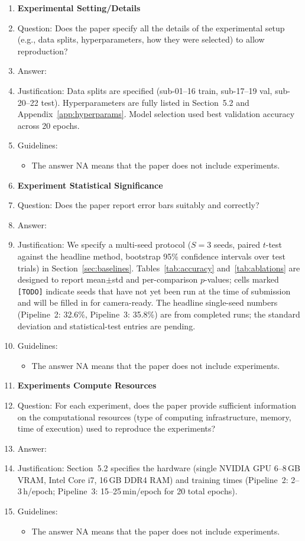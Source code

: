 \documentclass{article}
\begin{document}
\begin{enumerate}
\item {\bf Experimental Setting/Details}
    \item[] Question: Does the paper specify all the details of the experimental setup (e.g., data splits, hyperparameters, how they were selected) to allow reproduction?
    \item[] Answer: \answerYes{}
    \item[] Justification: Data splits are specified (sub-01--16 train, sub-17--19 val, sub-20--22 test). Hyperparameters are fully listed in Section~5.2 and Appendix~\ref{app:hyperparams}. Model selection used best validation accuracy across 20 epochs.
    \item[] Guidelines:
    \begin{itemize}
        \item The answer NA means that the paper does not include experiments.
    \end{itemize}

\item {\bf Experiment Statistical Significance}
    \item[] Question: Does the paper report error bars suitably and correctly?
    \item[] Answer: \answerYes{}
    \item[] Justification: We specify a multi-seed protocol ($S=3$ seeds, paired $t$-test against the headline method, bootstrap 95\% confidence intervals over test trials) in Section~\ref{sec:baselines}. Tables~\ref{tab:accuracy} and~\ref{tab:ablations} are designed to report mean$\pm$std and per-comparison $p$-values; cells marked \texttt{[TODO]} indicate seeds that have not yet been run at the time of submission and will be filled in for camera-ready. The headline single-seed numbers (Pipeline~2: 32.6\%, Pipeline~3: 35.8\%) are from completed runs; the standard deviation and statistical-test entries are pending.
    \item[] Guidelines:
    \begin{itemize}
        \item The answer NA means that the paper does not include experiments.
    \end{itemize}

\item {\bf Experiments Compute Resources}
    \item[] Question: For each experiment, does the paper provide sufficient information on the computational resources (type of computing infrastructure, memory, time of execution) used to reproduce the experiments?
    \item[] Answer: \answerYes{}
    \item[] Justification: Section~5.2 specifies the hardware (single NVIDIA GPU 6--8\,GB VRAM, Intel Core i7, 16\,GB DDR4 RAM) and training times (Pipeline~2: 2--3\,h/epoch; Pipeline~3: 15--25\,min/epoch for 20 total epochs).
    \item[] Guidelines:
    \begin{itemize}
        \item The answer NA means that the paper does not include experiments.
    \end{itemize}


\end{enumerate}
\end{document}
